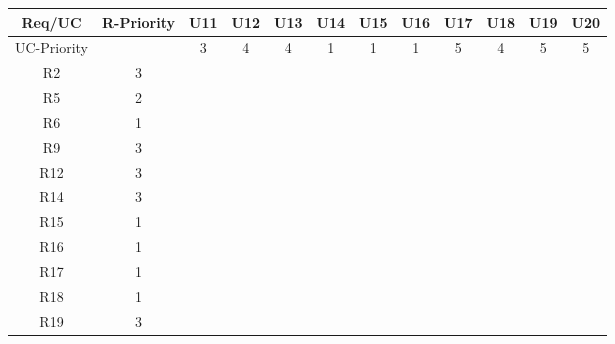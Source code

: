 \documentclass{article}
\begin{document}
\begin{longtable}{|c|c|c|c|c|c|c|c|c|c|c|c|}
	Req/UC      & R-Priority & U11      & U12      & U13      & U14      & U15      & U16      & U17      & U18      & U19      & U20      \\
	\hline
	UC-Priority &            & 3         & 4         & 4         & 1         & 1         & 1         & 5         & 4         & 5         & 5         \\
	\hline
	R2          & 3          &           &           &           &           &           &           &           &           &           &           \\
	\hline
	R5          & 2          &           &           &           &           &           &           &           &           &           &           \\
	\hline
	R6          & 1          &           &           &           &           &           &           &           &           &           &           \\
	\hline
	R9          & 3          &           &           &           &           &           &           &           &           &           &           \\
	\hline
	R12         & 3          &           &           &           &           &           &           &           &           &           &           \\
	\hline
	R14         & 3          &           &           &           &           &           &           &           &           &           &           \\
	\hline
	R15         & 1          &           &           &           &           &           &           &           &           &           &           \\
	\hline
	R16         & 1          &           &           &           &           &           &           &           &           &           &           \\
	\hline
	R17         & 1          &           &           &           &           &           &           &           &           &           &           \\
	\hline
	R18         & 1          &           &           &           &           &           &           &           &           &           &           \\
	\hline
	R19         & 3          &           &           &           &           &           &           &           &           &           &           \\

\end{longtable}
\end{document}
